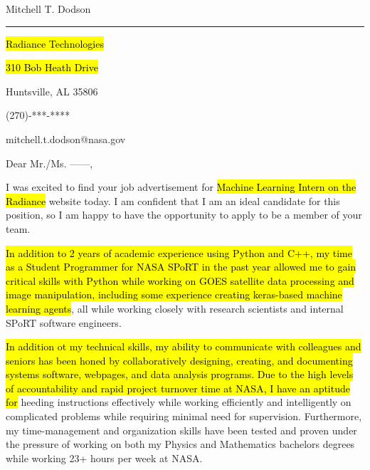 \documentclass[11pt]{article}
\begin{document}
\begin{center}
        {\color{OliveGreen}\LARGE{Mitchell T. Dodson}}

        \vspace{1em}

\hrule

        \noindent
        \begin{minipage}[t]{.49\textwidth}
                \begin{singlespace}

                \noindent
		\hl{Radiance Technologies}

                \noindent
		\hl{310 Bob Heath Drive}

                \noindent
		Huntsville, AL 35806

                \end{singlespace}
        \end{minipage}
        \begin{minipage}[t]{.49\textwidth}

                \vspace{1em}

                \hfill
                (270)-***-****

                \hfill
                mitchell.t.dodson@nasa.gov

        \end{minipage}
\end{center}

\vspace{2em}

\noindent
Dear Mr./Ms. ------,

\vspace{1em}
I was excited to find your job advertisement for \hl{Machine Learning Intern on the Radiance} website today. I am confident that I am an ideal candidate for this position, so I am happy to have the opportunity to apply to be a member of your team.

\hl{In addition to 2 years of academic experience using Python and C++, my time as a Student Programmer for NASA SPoRT in the past year allowed me to gain critical skills with Python while working on GOES satellite data processing and image manipulation, including some experience creating keras-based machine learning agents}, all while working closely with research scientists and internal SPoRT software engineers.

\hl{In addition ot my technical skills, my ability to communicate with colleagues and seniors has been honed by collaboratively designing, creating, and documenting systems software, webpages, and data analysis programs. Due to the high levels of accountability and rapid project turnover time at NASA, I have an aptitude for} heeding instructions effectively while working efficiently and intelligently on complicated problems while requiring minimal need for supervision. Furthermore, my time-management and organization skills have been tested and proven under the pressure of working on both my Physics and Mathematics bachelors degrees while working 23+ hours per week at NASA.
\end{document}
